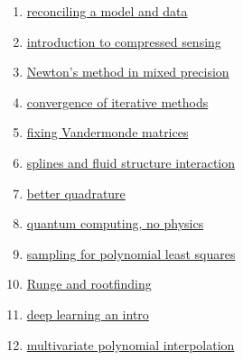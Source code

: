 \documentclass[12pt,letterpaper,noanswers]{exam}
\begin{document}
 \pdfpageheight 11in 
  \pdfpagewidth 8.5in

\begin{enumerate}
\item \href{https://epubs-siam-org.ezp-prod1.hul.harvard.edu/doi/10.1137/100799666}{reconciling a model and data}

\item \href{https://epubs-siam-org.ezp-prod1.hul.harvard.edu/doi/10.1137/110837681}{introduction to compressed sensing}

\item \href{https://epubs-siam-org.ezp-prod1.hul.harvard.edu/doi/10.1137/20M1342902}{Newton's method in mixed precision}

\item \href{https://epubs-siam-org.ezp-prod1.hul.harvard.edu/doi/10.1137/19M1244858}{convergence of iterative methods}

\item \href{https://epubs-siam-org.ezp-prod1.hul.harvard.edu/doi/10.1137/19M130100X}{fixing Vandermonde matrices}

\item \href{https://epubs-siam-org.ezp-prod1.hul.harvard.edu/doi/10.1137/18M1209283}{splines and fluid structure interaction}

\item \href{https://epubs-siam-org.ezp-prod1.hul.harvard.edu/doi/10.1137/18M1229353}{better quadrature}

\item \href{https://epubs-siam-org.ezp-prod1.hul.harvard.edu/doi/10.1137/18M1170650}{quantum computing, no physics}

\item \href{https://epubs-siam-org.ezp-prod1.hul.harvard.edu/doi/10.1137/18M1234151}{sampling for polynomial least squares}

\item \href{https://epubs-siam-org.ezp-prod1.hul.harvard.edu/doi/10.1137/18M1181985}{Runge and rootfinding}

\item \href{https://epubs-siam-org.ezp-prod1.hul.harvard.edu/doi/10.1137/18M1165748}{deep learning an intro}

\item \href{https://epubs-siam-org.ezp-prod1.hul.harvard.edu/doi/10.1137/17M1124188}{multivariate polynomial interpolation}




\end{enumerate}
\end{document}

